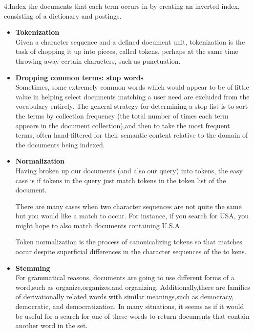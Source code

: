 4.Index the documents that each term occurs in by creating an inverted index,
  consisting of a dictionary and postings.


 
\begin{itemize}
     \item \textbf{Tokenization}\\ \label{tokenization}
     Given a character sequence and a defined document unit, tokenization is the
     task of chopping it up into pieces, called tokens, perhaps at the same time
     throwing away certain characters, such as punctuation.
     
     
     \item \textbf{Dropping common terms: stop words}\\
     Sometimes, some extremely common words which would appear to be of little value in helping select documents matching a user need are excluded from the vocabulary entirely.
     The general strategy for determining a stop list is to sort the terms by collection frequency (the total number of times each term appears in the document collection),and then to take the most frequent terms, often hand-filtered for their semantic content relative to the domain of the documents being indexed.
     
     
     \item  \textbf{Normalization}\\ 
     Having broken up our documents (and also our query) into tokens, the easy
     case is if tokens in the query just match tokens in the token list of the document.
     
     There are many cases when two character sequences are not quite the same but you would like a match to occur. For instance, if you search for USA, you might hope to also match documents containing U.S.A .
     
     Token normalization is the process of canonicalizing tokens so that matches occur despite superficial differences in the character sequences of the to kens.
    
    \item  \textbf{Stemming}\\
    For grammatical reasons, documents are going to use different forms of a word,such as organize,organizes,and organizing. Additionally,there are families of derivationally related words with similar meanings,such as democracy, democratic, and democratization. In many situations, it seems as if it would be useful for a search for one of these words to return documents that contain another word in the set.
    


\end{itemize}
